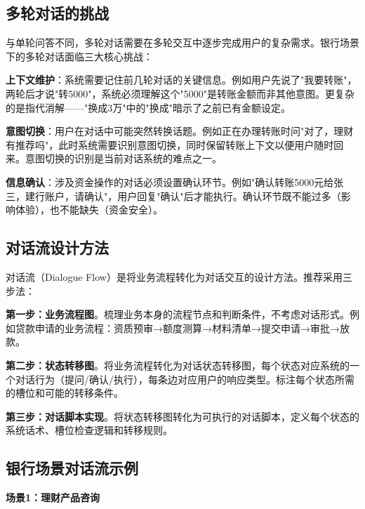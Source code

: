 \subsection{多轮对话的挑战}

与单轮问答不同，多轮对话需要在多轮交互中逐步完成用户的复杂需求。银行场景下的多轮对话面临三大核心挑战：

\textbf{上下文维护}：系统需要记住前几轮对话的关键信息。例如用户先说了"我要转账"，两轮后才说"转5000"，系统必须理解这个"5000"是转账金额而非其他意图。更复杂的是指代消解——"换成3万"中的"换成"暗示了之前已有金额设定。

\textbf{意图切换}：用户在对话中可能突然转换话题。例如正在办理转账时问"对了，理财有推荐吗"，此时系统需要识别意图切换，同时保留转账上下文以便用户随时回来。意图切换的识别是当前对话系统的难点之一。

\textbf{信息确认}：涉及资金操作的对话必须设置确认环节。例如"确认转账5000元给张三，建行账户，请确认"，用户回复"确认"后才能执行。确认环节既不能过多（影响体验），也不能缺失（资金安全）。

\subsection{对话流设计方法}

对话流（Dialogue Flow）是将业务流程转化为对话交互的设计方法。推荐采用三步法：

\textbf{第一步：业务流程图}。梳理业务本身的流程节点和判断条件，不考虑对话形式。例如贷款申请的业务流程：资质预审→额度测算→材料清单→提交申请→审批→放款。

\textbf{第二步：状态转移图}。将业务流程转化为对话状态转移图，每个状态对应系统的一个对话行为（提问/确认/执行），每条边对应用户的响应类型。标注每个状态所需的槽位和可能的转移条件。

\textbf{第三步：对话脚本实现}。将状态转移图转化为可执行的对话脚本，定义每个状态的系统话术、槽位检查逻辑和转移规则。

\subsection{银行场景对话流示例}

\textbf{场景1：理财产品咨询}

